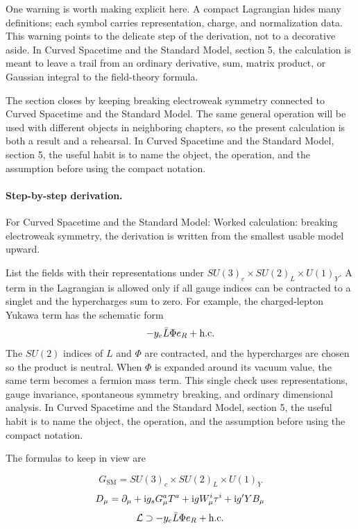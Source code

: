 One warning is worth making explicit here.  A compact Lagrangian hides many definitions; each symbol carries representation, charge, and normalization data.  This warning points to the delicate step of the derivation, not to a decorative aside.  In Curved Spacetime and the Standard Model, section 5, the calculation is meant to leave a trail from an ordinary derivative, sum, matrix product, or Gaussian integral to the field-theory formula.

The section closes by keeping breaking electroweak symmetry connected to Curved Spacetime and the Standard Model.  The same general operation will be used with different objects in neighboring chapters, so the present calculation is both a result and a rehearsal.  In Curved Spacetime and the Standard Model, section 5, the useful habit is to name the object, the operation, and the assumption before using the compact notation.



\paragraph{Step-by-step derivation.}

For Curved Spacetime and the Standard Model: Worked calculation: breaking electroweak symmetry, the derivation is written from the smallest usable model upward.

List the fields with their representations under \(SU(3)_c\times SU(2)_L\times U(1)_Y\).  A term in the Lagrangian is allowed only if all gauge indices can be contracted to a singlet and the hypercharges sum to zero.  For example, the charged-lepton Yukawa term has the schematic form
\[
  -y_e\bar L\Phi e_R+\hbox{h.c.}
\]
The \(SU(2)\) indices of \(L\) and \(\Phi\) are contracted, and the hypercharges are chosen so the product is neutral.  When \(\Phi\) is expanded around its vacuum value, the same term becomes a fermion mass term.  This single check uses representations, gauge invariance, spontaneous symmetry breaking, and ordinary dimensional analysis.  In Curved Spacetime and the Standard Model, section 5, the useful habit is to name the object, the operation, and the assumption before using the compact notation.

The formulas to keep in view are

\[
  G_{\mathrm{SM}}=SU(3)_c\times SU(2)_L\times U(1)_Y
\]
\[
  D_\mu=\partial_\mu+\mathrm i g_sG_\mu^aT^a+\mathrm i gW_\mu^i\tau^i+\mathrm i g'YB_\mu
\]
\[
  \mathcal L\supset -y_e\bar L\Phi e_R+\hbox{h.c.}
\]

